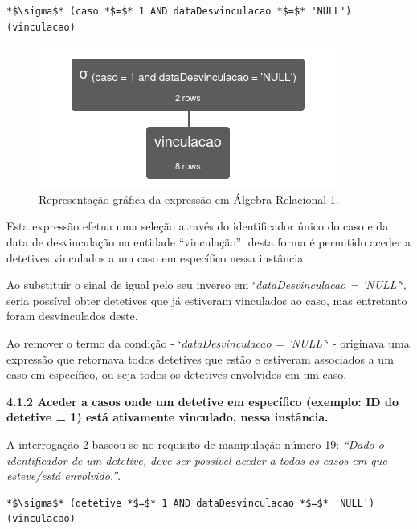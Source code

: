 \documentclass[a4paper,12pt]{scrreprt}
\begin{document}
\begin{lstlisting}[escapechar=*]
*$\sigma$* (caso *$=$* 1 AND dataDesvinculacao *$=$* 'NULL') (vinculacao)
\end{lstlisting}

\begin{figure}[!ht]
    \centering
    \includegraphics[scale=0.9]{images/relax/1.png}
    \caption{Representação gráfica da expressão em Álgebra Relacional 1.}
 \end{figure}
\vspace{0.2cm}

Esta expressão efetua uma seleção através do identificador único do caso e da data de desvinculação na entidade “vinculação”, desta forma é permitido aceder a detetives vinculados a um caso em específico nessa instância.

Ao substituir o sinal de igual pelo seu inverso em `\textit{dataDesvinculacao = 'NULL'}`, seria possível obter detetives que já estiveram vinculados ao caso, mas entretanto foram desvinculados deste.

Ao remover o termo da condição - `\textit{dataDesvinculacao = 'NULL'}` - originava uma expressão que retornava todos detetives que estão e estiveram associados a um caso em específico, ou seja todos os detetives envolvidos em um caso.

\clearpage %
{\large\textbf{4.1.2 Aceder a casos onde um detetive em específico (exemplo: ID do detetive = 1) está ativamente vinculado, nessa instância.}}

\vspace{0.2cm}

A interrogação 2 baseou-se no requisito de manipulação número 19: \textit{“Dado o identificador de um detetive, deve ser possível aceder a todos os casos em que esteve/está envolvido.”}.

\vspace{0.2cm}

\begin{lstlisting}[escapechar=*]
*$\sigma$* (detetive *$=$* 1 AND dataDesvinculacao *$=$* 'NULL') (vinculacao)
\end{lstlisting}
\end{document}
